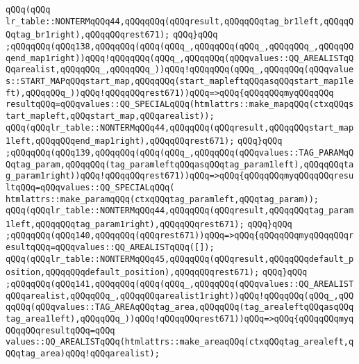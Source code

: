 \verb|qQQq(qQQq|\newline
\verb|lr_table::NONTERMqQQq44,qQQqqQQq(qQQqresult,qQQqqQQqtag_br1left,qQQqqQQqtag_br1right),qQQqqQQqrest671);|\newline
\verb|qQQq}qQQq|\newline
\verb|;qQQqqQQq(qQQq138,qQQqqQQq(qQQq(qQQq_,qQQqqQQq(qQQq_,qQQqqQQq_,qQQqqQQqend_map1right))qQQq!qQQqqQQq(qQQq_,qQQqqQQq(qQQqvalues::QQ_AREALISTqQQqarealist,qQQqqQQq_,qQQqqQQq_))qQQq!qQQqqQQq(qQQq_,qQQqqQQq(qQQqvalues::START_MAPqQQqstart_map,qQQqqQQq(start_mapleftqQQqasqQQqstart_map1left),qQQqqQQq_))qQQq!qQQqqQQqrest671))qQQq=>qQQq{qQQqqQQqmyqQQqqQQq|\newline
\verb|resultqQQq=qQQqvalues::QQ_SPECIALqQQq(htmlattrs::make_mapqQQq(ctxqQQqstart_mapleft,qQQqstart_map,qQQqarealist));|\newline
\verb|qQQq(qQQqlr_table::NONTERMqQQq44,qQQqqQQq(qQQqresult,qQQqqQQqstart_map1left,qQQqqQQqend_map1right),qQQqqQQqrest671);|\newline
\verb|qQQq}qQQq|\newline
\verb|;qQQqqQQq(qQQq139,qQQqqQQq(qQQq(qQQq_,qQQqqQQq(qQQqvalues::TAG_PARAMqQQqtag_param,qQQqqQQq(tag_paramleftqQQqasqQQqtag_param1left),qQQqqQQqtag_param1right))qQQq!qQQqqQQqrest671))qQQq=>qQQq{qQQqqQQqmyqQQqqQQqresultqQQq=qQQqvalues::QQ_SPECIALqQQq(|\newline
\verb|htmlattrs::make_paramqQQq(ctxqQQqtag_paramleft,qQQqtag_param));|\newline
\verb|qQQq(qQQqlr_table::NONTERMqQQq44,qQQqqQQq(qQQqresult,qQQqqQQqtag_param1left,qQQqqQQqtag_param1right),qQQqqQQqrest671);|\newline
\verb|qQQq}qQQq|\newline
\verb|;qQQqqQQq(qQQq140,qQQqqQQq(qQQqrest671))qQQq=>qQQq{qQQqqQQqmyqQQqqQQqresultqQQq=qQQqvalues::QQ_AREALISTqQQq([]);|\newline
\verb|qQQq(qQQqlr_table::NONTERMqQQq45,qQQqqQQq(qQQqresult,qQQqqQQqdefault_position,qQQqqQQqdefault_position),qQQqqQQqrest671);|\newline
\verb|qQQq}qQQq|\newline
\verb|;qQQqqQQq(qQQq141,qQQqqQQq(qQQq(qQQq_,qQQqqQQq(qQQqvalues::QQ_AREALISTqQQqarealist,qQQqqQQq_,qQQqqQQqarealist1right))qQQq!qQQqqQQq(qQQq_,qQQqqQQq(qQQqvalues::TAG_AREAqQQqtag_area,qQQqqQQq(tag_arealeftqQQqasqQQqtag_area1left),qQQqqQQq_))qQQq!qQQqqQQqrest671))qQQq=>qQQq{qQQqqQQqmyqQQqqQQqresultqQQq=qQQq|\newline
\verb|values::QQ_AREALISTqQQq(htmlattrs::make_areaqQQq(ctxqQQqtag_arealeft,qQQqtag_area)qQQq!qQQqarealist);|\newline
